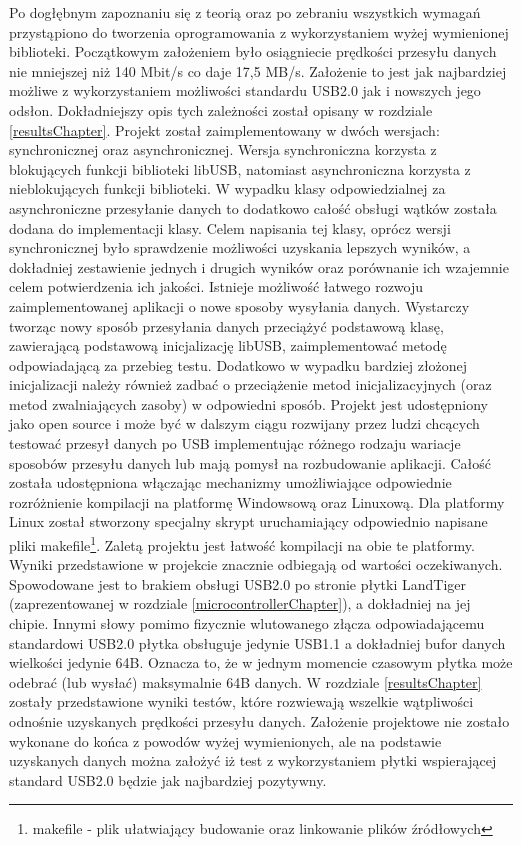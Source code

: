 \documentclass{BscUS}
\begin{document}
\indent Po dogłębnym zapoznaniu się z teorią oraz po zebraniu wszystkich wymagań przystąpiono do tworzenia oprogramowania z wykorzystaniem wyżej wymienionej biblioteki. Początkowym założeniem było osiągniecie prędkości przesyłu danych nie mniejszej niż 140 Mbit/s co daje 17,5 MB/s. Założenie to jest jak najbardziej możliwe z wykorzystaniem możliwości standardu USB2.0 jak i nowszych jego odsłon. Dokładniejszy opis tych zależności został opisany w rozdziale \ref{resultsChapter}. Projekt został zaimplementowany w dwóch wersjach: synchronicznej oraz asynchronicznej. Wersja synchroniczna korzysta z blokujących funkcji biblioteki libUSB, natomiast asynchroniczna korzysta z nieblokujących funkcji biblioteki. W wypadku klasy odpowiedzialnej za asynchroniczne przesyłanie danych to dodatkowo całość obsługi wątków została dodana do implementacji klasy. Celem napisania tej klasy, oprócz wersji synchronicznej było sprawdzenie możliwości uzyskania lepszych wyników, a dokładniej zestawienie jednych i drugich wyników oraz porównanie ich wzajemnie celem potwierdzenia ich jakości. Istnieje możliwość łatwego rozwoju zaimplementowanej aplikacji o nowe sposoby wysyłania danych. Wystarczy tworząc nowy sposób przesyłania danych przeciążyć podstawową klasę, zawierającą podstawową inicjalizację libUSB, zaimplementować metodę odpowiadającą za przebieg testu. Dodatkowo w wypadku bardziej złożonej inicjalizacji należy również zadbać o przeciążenie metod inicjalizacyjnych (oraz metod zwalniających zasoby) w odpowiedni sposób.
\newline
\indent Projekt jest udostępniony jako open source i może być w dalszym ciągu rozwijany przez ludzi chcących testować przesył danych po USB implementując różnego rodzaju wariacje sposobów przesyłu danych lub mają pomysł na rozbudowanie aplikacji. Całość została udostępniona włączając mechanizmy umożliwiające odpowiednie rozróżnienie kompilacji na platformę Windowsową oraz Linuxową. Dla platformy Linux został stworzony specjalny skrypt uruchamiający odpowiednio napisane pliki makefile\footnote{makefile - plik ułatwiający budowanie oraz linkowanie plików źródłowych}. Zaletą projektu jest łatwość kompilacji na obie te platformy.
\newline
\indent Wyniki przedstawione w projekcie znacznie odbiegają od wartości oczekiwanych. Spowodowane jest to brakiem obsługi USB2.0 po stronie płytki LandTiger (zaprezentowanej w rozdziale \ref{microcontrollerChapter}), a dokładniej na jej chipie. Innymi słowy pomimo fizycznie wlutowanego złącza odpowiadającemu standardowi USB2.0 płytka obsługuje jedynie USB1.1 a dokładniej bufor danych wielkości jedynie 64B. Oznacza to, że w jednym momencie czasowym płytka może odebrać (lub wysłać) maksymalnie 64B danych. W rozdziale \ref{resultsChapter} zostały przedstawione wyniki testów, które rozwiewają wszelkie wątpliwości odnośnie uzyskanych prędkości przesyłu danych. Założenie projektowe nie zostało wykonane do końca z powodów wyżej wymienionych, ale na podstawie uzyskanych danych można założyć iż test z wykorzystaniem płytki wspierającej standard USB2.0 będzie jak najbardziej pozytywny.
\end{document}
